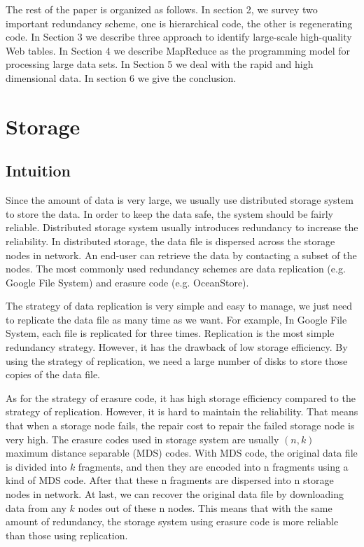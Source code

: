 \documentclass{article} %
\begin{document}
The rest of the paper is organized as follows. In section 2, we survey two important redundancy scheme, one is hierarchical code, the other is regenerating code. In Section 3 we describe three approach to identify large-scale high-quality Web tables. In Section 4 we describe MapReduce as the programming model for processing large data sets. In Section 5 we deal with the rapid and high dimensional data. In section 6 we give the conclusion.

\section{Storage}
\subsection{Intuition}
Since the amount of data is very large, we usually use distributed storage system to store the data. In order to keep the data safe, the system should be fairly reliable. Distributed storage system usually introduces redundancy to increase the reliability. In distributed storage, the data file is dispersed across the storage nodes in network. An end-user can retrieve the data by contacting a subset of the nodes. The most commonly used redundancy schemes are data replication (e.g. Google File System) and erasure code (e.g. OceanStore).

The strategy of data replication is very simple and easy to manage, we just need to replicate the data file as many time as we want. For example, In Google File System, each file is replicated for three times. Replication is the most simple redundancy strategy. However, it has the drawback of low storage efficiency. By using the strategy of replication, we need a large number of disks to store those copies of the data file.

As for the strategy of erasure code, it has high storage efficiency compared to the strategy of replication. However, it is hard to maintain the reliability. That means that when a storage node fails, the repair cost to repair the failed storage node is very high. The erasure codes used in storage system are usually $(n, k)$ maximum distance separable (MDS) codes. With MDS code, the original data file is divided into $k$ fragments, and then they are encoded into n fragments using a kind of MDS code. After that these n fragments are dispersed into n storage nodes in network. At last, we can recover the original data file by downloading data from any $k$ nodes out of these n nodes. This means that with the same amount of redundancy, the storage system using erasure code is more reliable than those using replication.
\end{document}

